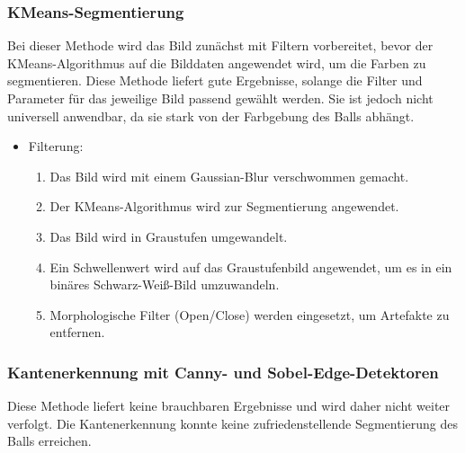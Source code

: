 \newpage

\subsubsection{KMeans-Segmentierung}

Bei dieser Methode wird das Bild zunächst mit Filtern vorbereitet, bevor der KMeans-Algorithmus auf die Bilddaten angewendet wird, um die Farben zu segmentieren. Diese Methode liefert gute Ergebnisse, solange die Filter und Parameter für das jeweilige Bild passend gewählt werden. Sie ist jedoch nicht universell anwendbar, da sie stark von der Farbgebung des Balls abhängt.

\begin{itemize}
    \item Filterung:
    \begin{enumerate}
        \item Das Bild wird mit einem Gaussian-Blur verschwommen gemacht.
        \item Der KMeans-Algorithmus wird zur Segmentierung angewendet.
        \item Das Bild wird in Graustufen umgewandelt.
        \item Ein Schwellenwert wird auf das Graustufenbild angewendet, um es in ein binäres Schwarz-Weiß-Bild umzuwandeln.
        \item Morphologische Filter (Open/Close) werden eingesetzt, um Artefakte zu entfernen.
    \end{enumerate}
\end{itemize}

\begin{minipage}[t]{0.4\textwidth}
\end{minipage}
%
\begin{minipage}[t]{0.6\textwidth}
\end{minipage}


\subsubsection{Kantenerkennung mit Canny- und Sobel-Edge-Detektoren}

Diese Methode liefert keine brauchbaren Ergebnisse und wird daher nicht weiter verfolgt. Die Kantenerkennung konnte keine zufriedenstellende Segmentierung des Balls erreichen.

